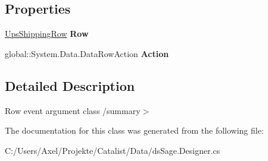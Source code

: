 \subsection*{Properties}
\begin{DoxyCompactItemize}
\item 
\hyperlink{class_products_1_1_data_1_1ds_sage_1_1_ups_shipping_row}{Ups\+Shipping\+Row} {\bfseries Row}\hypertarget{class_products_1_1_data_1_1ds_sage_1_1_ups_shipping_row_change_event_ac2132b39d710c53561a22163998b08ab}{}\label{class_products_1_1_data_1_1ds_sage_1_1_ups_shipping_row_change_event_ac2132b39d710c53561a22163998b08ab}

\item 
global\+::\+System.\+Data.\+Data\+Row\+Action {\bfseries Action}\hypertarget{class_products_1_1_data_1_1ds_sage_1_1_ups_shipping_row_change_event_a9ed185b4db934ef32c4b9aebdd59b79c}{}\label{class_products_1_1_data_1_1ds_sage_1_1_ups_shipping_row_change_event_a9ed185b4db934ef32c4b9aebdd59b79c}

\end{DoxyCompactItemize}


\subsection{Detailed Description}
Row event argument class /summary$>$ 

The documentation for this class was generated from the following file\+:\begin{DoxyCompactItemize}
\item 
C\+:/\+Users/\+Axel/\+Projekte/\+Catalist/\+Data/ds\+Sage.\+Designer.\+cs\end{DoxyCompactItemize}
